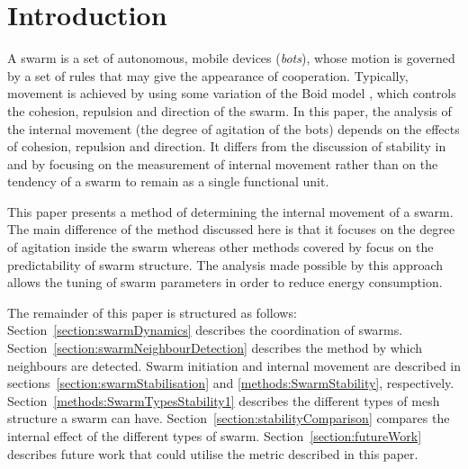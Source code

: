 \documentclass[10pt,journal,letterpaper,twoside]{IEEEtran}
\newcommand{\stability}{internal movement}
\begin{document}
\IEEEdisplaynotcompsoctitleabstractindextext


%
\IEEEpeerreviewmaketitle

\section{Introduction\label{section:introduction}}

A swarm is a set of autonomous, mobile devices (\emph{bots}),
whose motion is governed by a set of rules that may give the appearance
of cooperation.
Typically, movement is
achieved by using some variation of the Boid model \cite{CR87}, which
controls the cohesion, repulsion and direction of the swarm.
In this paper, the analysis of
the \stability{} (the degree of agitation of the bots) depends
on the effects of cohesion, repulsion and direction.  It differs from the discussion
of stability in \cite{VGKP02} and \cite{XCFPLLHF06} by focusing on the
measurement of \stability{} rather than on the tendency of a swarm to remain as a single functional
unit.


This paper presents a method of determining the \stability{} of a
swarm. The main difference of the method discussed here is that it focuses on the degree of agitation inside the swarm whereas other
methods covered by \cite{VGKP02} \cite{XCFPLLHF06} \cite{VGKP11} focus on the
predictability of swarm structure. The analysis made possible by this approach allows the tuning of swarm parameters in order to reduce energy consumption.

The remainder of this paper is structured as follows:
Section~\ref{section:swarmDynamics} describes the coordination of
swarms. Section~\ref{section:swarmNeighbourDetection} describes the
method by which neighbours are detected. Swarm initiation and internal movement are described in sections~\ref{section:swarmStabilisation} and \ref{methods:SwarmStability}, respectively. Section~\ref{methods:SwarmTypesStability1} describes the different types of
mesh structure a swarm can have. Section~\ref{section:stabilityComparison} compares the internal effect of the
different types of swarm. Section~\ref{section:futureWork} describes
future work that could utilise the metric described in this paper.
\end{document}
